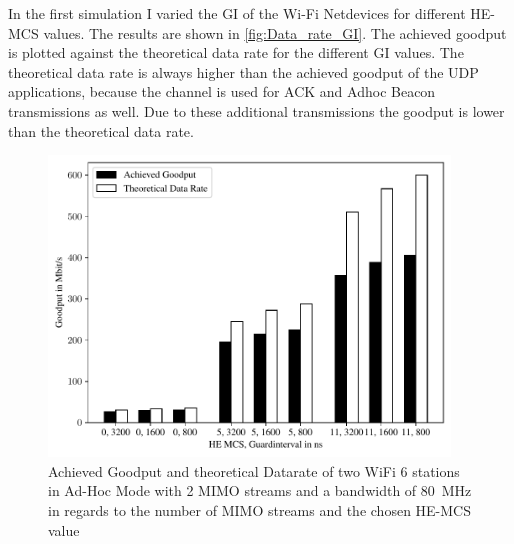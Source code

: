 In the first simulation I varied the \ac{GI} of the Wi-Fi Netdevices for different HE-\ac{MCS} values.
The results are shown in \autoref{fig:Data_rate_GI}. The achieved goodput is plotted against the theoretical data rate for the different \ac{GI} values.
The theoretical data rate is always higher than the achieved goodput of the UDP applications, because the channel is used for ACK and Adhoc Beacon transmissions as well. Due to
these additional transmissions the goodput is lower than the theoretical data rate.
\begin{figure}[H]
	\centering
	\includegraphics[width=0.95\textwidth]{figures/gi_dataRate_simulation.pdf}
	\caption{Achieved Goodput and theoretical Datarate of two WiFi 6 stations in Ad-Hoc Mode with \num{2} \acf{MIMO} streams and a bandwidth of \SI{80}{\mega\hertz} in regards to the number of \acf{MIMO} streams and the chosen HE-\acf{MCS} value}%
	\label{fig:Data_rate_GI}%
\end{figure}

